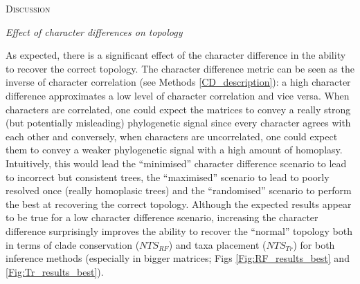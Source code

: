 \documentclass[12pt,letterpaper]{article}
\renewcommand{\section}[1]{%
\bigskip
\begin{center}
\begin{Large}
\normalfont\scshape #1
\medskip
\end{Large}
\end{center}}
\renewcommand{\subsection}[1]{%
\bigskip
\begin{center}
\begin{large}
\normalfont\itshape #1
\end{large}
\end{center}}
\begin{document}
\section{Discussion}

\subsection{Effect of character differences on topology}
As expected, there is a significant effect of the character difference in the ability to recover the correct topology.
The character difference metric can be seen as the inverse of character correlation (see Methods \ref{CD_description}): a high character difference approximates a low level of character correlation and vice versa.
When characters are correlated, one could expect the matrices to convey a really strong (but potentially misleading) phylogenetic signal since every character agrees with each other and conversely, when characters are uncorrelated, one could expect them to convey a weaker phylogenetic signal with a high amount of homoplasy.
Intuitively, this would lead the ``minimised'' character difference scenario to lead to incorrect but consistent trees, the ``maximised'' scenario to lead to poorly resolved once (really homoplasic trees) and the ``randomised'' scenario to perform the best at recovering the correct topology.
Although the expected results appear to be true for a low character difference scenario, increasing the character difference surprisingly improves the ability to recover the ``normal'' topology both in terms of clade conservation ($NTS_{RF}$) and taxa placement ($NTS_{Tr}$) for both inference methods (especially in bigger matrices; Figs \ref{Fig:RF_results_best} and \ref{Fig:Tr_results_best}).

\end{document}

